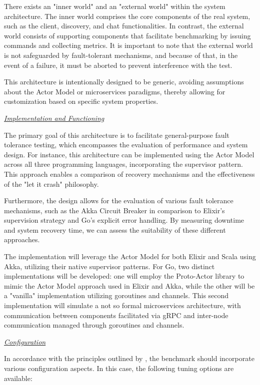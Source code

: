 There exists an "inner world" and an "external world" within the system architecture. The inner world comprises the core components of the real system, such as the client, discovery, and chat functionalities. In contrast, the external world consists of supporting components that facilitate benchmarking by issuing commands and collecting metrics. It is important to note that the external world is not safeguarded by fault-tolerant mechanisms, and because of that, in the event of a failure, it must be aborted to prevent interference with the test.

This architecture is intentionally designed to be generic, avoiding assumptions about the Actor Model or microservices paradigms, thereby allowing for customization based on specific system properties.

\textit{\underline{Implementation and Functioning}}

The primary goal of this architecture is to facilitate general-purpose fault tolerance testing, which encompasses the evaluation of performance and system design. For instance, this architecture can be implemented using the Actor Model across all three programming languages, incorporating the supervisor pattern. This approach enables a comparison of recovery mechanisms and the effectiveness of the "let it crash" philosophy.

Furthermore, the design allows for the evaluation of various fault tolerance mechanisms, such as the Akka Circuit Breaker in comparison to Elixir’s supervision strategy and Go's explicit error handling. By measuring downtime and system recovery time, we can assess the suitability of these different approaches.

The implementation will leverage the Actor Model for both Elixir and Scala using Akka, utilizing their native supervisor patterns. For Go, two distinct implementations will be developed: one will employ the Proto-Actor library to mimic the Actor Model approach used in Elixir and Akka, while the other will be a "vanilla" implementation utilizing goroutines and channels. This second implementation will simulate a not so formal microservices architecture, with communication between components facilitated via \gls{gRPC} and inter-node communication managed through goroutines and channels.

\textit{\underline{Configuration}}

In accordance with the principles outlined by \textcite{Blessing2019}, the benchmark should incorporate various configuration aspects. In this case, the following tuning options are available:

